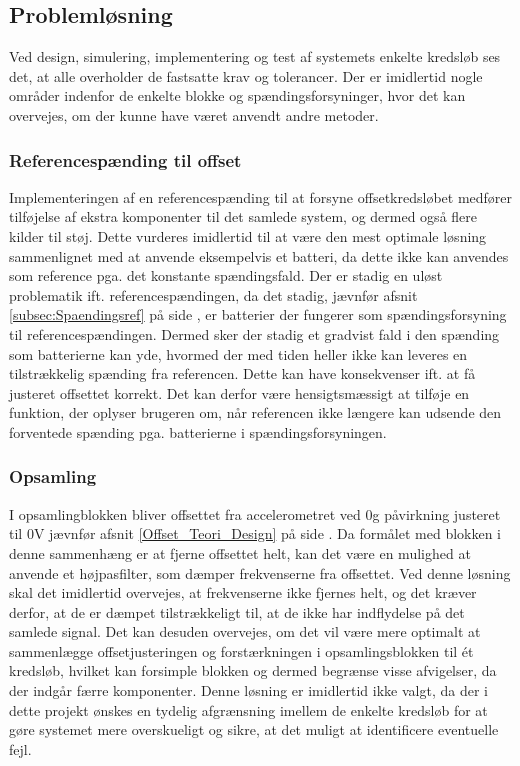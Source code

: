 \subsection{Problemløsning}
Ved design, simulering, implementering og test af systemets enkelte kredsløb ses det, at alle overholder de fastsatte krav og tolerancer. Der er imidlertid nogle områder indenfor de enkelte blokke og spændingsforsyninger, hvor det kan overvejes, om der kunne have været anvendt andre metoder.

\subsubsection{Referencespænding til offset}
Implementeringen af en referencespænding til at forsyne offsetkredsløbet medfører tilføjelse af ekstra komponenter til det samlede system, og dermed også flere kilder til støj. Dette vurderes imidlertid til at være den mest optimale løsning sammenlignet med at anvende eksempelvis et batteri, da dette ikke kan anvendes som reference pga. det konstante spændingsfald. Der er stadig en uløst problematik ift. referencespændingen, da det stadig, jævnfør afsnit \ref{subsec:Spaendingsref} på side \pageref{subsec:Spaendingsref}, er batterier der fungerer som spændingsforsyning til referencespændingen. Dermed sker der stadig et gradvist fald i den spænding som batterierne kan yde, hvormed der med tiden heller ikke kan leveres en tilstrækkelig spænding fra referencen. Dette kan have konsekvenser ift. at få justeret offsettet korrekt. Det kan derfor være hensigtsmæssigt at tilføje en funktion, der oplyser brugeren om, når referencen ikke længere kan udsende den forventede spænding pga. batterierne i spændingsforsyningen.  

\subsubsection{Opsamling}
I opsamlingblokken bliver offsettet fra accelerometret ved $0$g påvirkning justeret til $0$V jævnfør afsnit \ref{Offset_Teori_Design} på side \pageref{Offset_Teori_Design}. Da formålet med blokken i denne sammenhæng er at fjerne offsettet helt, kan det være en mulighed at anvende et højpasfilter, som dæmper frekvenserne fra offsettet. Ved denne løsning skal det imidlertid overvejes, at frekvenserne ikke fjernes helt, og det kræver derfor, at de er dæmpet tilstrækkeligt til, at de ikke har indflydelse på det samlede signal. Det kan desuden overvejes, om det vil være mere optimalt at sammenlægge offsetjusteringen og forstærkningen i opsamlingsblokken til ét kredsløb, hvilket kan forsimple blokken og dermed begrænse visse afvigelser, da der indgår færre komponenter. Denne løsning er imidlertid ikke valgt, da der i dette projekt ønskes en tydelig afgrænsning imellem de enkelte kredsløb for at gøre systemet mere overskueligt og sikre, at det muligt at identificere eventuelle fejl. 

